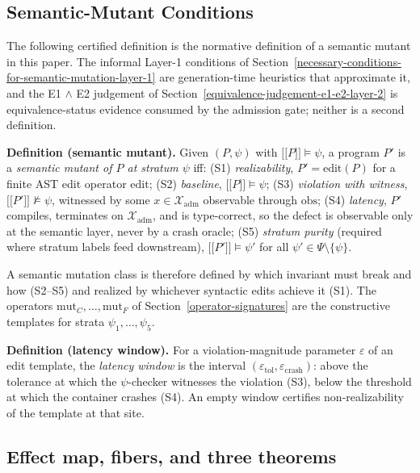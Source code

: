 \documentclass[review,12pt,authoryear]{elsarticle}
\providecommand{\llbracket}{\mathopen{\lbrack\!\lbrack}}
\providecommand{\rrbracket}{\mathclose{\rbrack\!\rbrack}}
\begin{document}
\subsection{Semantic-Mutant Conditions}\label{theory-s1s5}

The following certified definition is the normative definition of a
semantic mutant in this paper. The informal Layer-1 conditions of
Section~\ref{necessary-conditions-for-semantic-mutation-layer-1} are
generation-time heuristics that approximate it, and the E1 $\wedge$ E2
judgement of Section~\ref{equivalence-judgement-e1-e2-layer-2} is
equivalence-status evidence consumed by the admission gate; neither is a
second definition.

\textbf{Definition (semantic mutant).} Given $(P, \psi)$ with
$\llbracket P \rrbracket \models \psi$, a program $P'$ is a
\emph{semantic mutant of $P$ at stratum $\psi$} iff: (S1)
\emph{realizability}, $P' = \mathrm{edit}(P)$ for a finite AST edit
operator $\mathrm{edit}$; (S2)
\emph{baseline}, $\llbracket P \rrbracket \models \psi$; (S3)
\emph{violation with witness},
$\llbracket P' \rrbracket \not\models \psi$, witnessed by some
$x \in \mathcal{X}_{\mathrm{adm}}$ observable through $\mathrm{obs}$; (S4)
\emph{latency}, $P'$ compiles, terminates on $\mathcal{X}_{\mathrm{adm}}$,
and is type-correct, so the defect is observable only at the semantic
layer, never by a crash oracle; (S5) \emph{stratum purity} (required
where stratum labels feed downstream),
$\llbracket P' \rrbracket \models \psi'$ for all
$\psi' \in \Psi \setminus \{\psi\}$.

A semantic mutation class is therefore defined by which invariant must
break and how (S2--S5) and realized by whichever syntactic edits achieve
it (S1). The operators $\mathrm{mut}_C, \dots, \mathrm{mut}_F$ of Section~\ref{operator-signatures}
are the constructive templates for strata $\psi_1, \dots, \psi_5$.

\textbf{Definition (latency window).} For a violation-magnitude
parameter $\varepsilon$ of an edit template, the \emph{latency window}
is the interval $(\varepsilon_{\mathrm{tol}}, \varepsilon_{\mathrm{crash}})$:
above the tolerance at which the $\psi$-checker witnesses the violation
(S3), below the threshold at which the container crashes (S4). An empty
window certifies non-realizability of the template at that site.

\subsection{Effect map, fibers, and three theorems}\label{theory-fibers}
\end{document}

